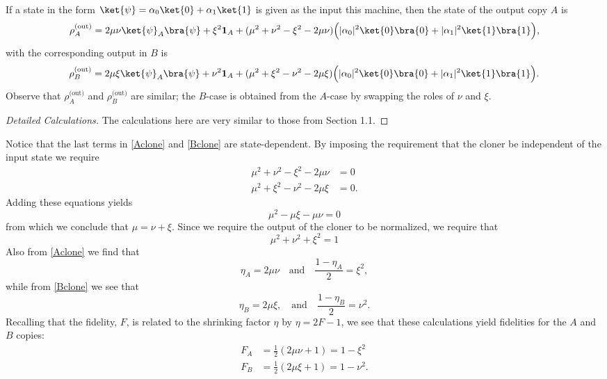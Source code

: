\documentclass[reqno]{amsart}
\numberwithin{lemma}{section}
\numberwithin{proposition}{section}
\begin{document}
If a state in the form $\ket{\psi} = \alpha_{0} \ket{0} + \alpha_{1} \ket{1}$ is given as the input this machine, then the state of the output copy $A$ is
\begin{equation}
\label{Aclone}
    \rho_{A}^{\text{(out)}} = 2 \mu \nu \ket{\psi}_{A} \bra{\psi} + \xi^{2} \mathbf{1}_{A} + (\mu^{2} + \nu^{2} - \xi^{2} - 2\mu \nu)\Big ( \vert \alpha_{0} \vert^{2} \ket{0} \bra{0} + \vert \alpha_{1} \vert^{2} \ket{1} \bra{1} \Big ),
\end{equation}
with the corresponding  output in $B$ is
\begin{equation}
\label{Bclone}
    \rho_{B}^{\text{(out)}} = 2 \mu \xi \ket{\psi}_{A} \bra{\psi} + \nu^{2} \mathbf{1}_{A} + (\mu^{2} + \xi^{2} - \nu^{2} - 2\mu \xi)\Big ( \vert \alpha_{0} \vert^{2} \ket{0} \bra{0} + \vert \alpha_{1} \vert^{2} \ket{1} \bra{1} \Big ).
\end{equation}
Observe that $\rho_{A}^{\text{(out)}}$ and $\rho_{B}^{\text{(out)}}$ are similar; the $B$-case is obtained from the $A$-case by swapping the roles of $\nu$ and $\xi$.

\begin{proof}[Detailed Calculations]
The calculations here are very similar to those from Section 1.1. 
\end{proof}

Notice that the last terms in \eqref{Aclone} and \eqref{Bclone} are state-dependent. By imposing the requirement that the cloner be independent of the input state we require
\begin{align*}
    \mu^{2} + \nu^{2} - \xi^{2} - 2\mu \nu &= 0\\
    \mu^{2} + \xi^{2} - \nu^{2} - 2\mu \xi &= 0.
\end{align*}
Adding these equations yields
\begin{equation*}
    \mu^{2} - \mu \xi - \mu \nu = 0
\end{equation*}
from which we conclude that $\mu = \nu + \xi$. Since we require the output of the cloner to be normalized, we require that
\begin{equation}
\label{normalization}
    \mu^{2} + \nu^{2} + \xi^{2} = 1
\end{equation}
Also from \eqref{Aclone} we find that
\begin{equation*}
    \eta_{A} = 2\mu \nu \quad \text{and}  \quad \frac{1 - \eta_{A}}{2} = \xi^{2},
\end{equation*}
while from \eqref{Bclone} we see that
\begin{equation*}
    \eta_{B} = 2 \mu \xi, \quad \text{and} \quad \frac{1 - \eta_{B}}{2} = \nu^{2}.
\end{equation*}
Recalling that the fidelity, $F$, is related to the shrinking factor $\eta$ by $\eta = 2F - 1$, we see that these calculations yield fidelities for the $A$ and $B$ copies:
\begin{align*} 
    F_{A} &= \frac{1}{2} (2 \mu \nu + 1) = 1 - \xi^{2}\\
    F_{B} &= \frac{1}{2} (2 \mu \xi + 1) = 1 - \nu^{2}.
\end{align*}
\end{document}
